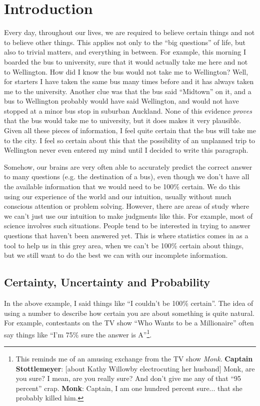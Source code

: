 \chapter{Introduction}
Every day, throughout our lives, we are required 
to believe certain things and not to believe other things. This applies not
only to the ``big questions'' of life, but also to trivial matters, and 
everything in between. For example, this morning I boarded the bus to 
university, sure that it would actually take me here and not to Wellington.
How did I know the bus would not take me to Wellington? Well, for starters
I have taken the same bus many times before and it has always taken me to the
university. Another clue was that the bus said ``Midtown'' on it, and a bus
to Wellington probably would have said Wellington, and would not have stopped
at a minor bus stop in suburban Auckland.
None of this evidence {\it proves} that the bus would take me to university,
but it does makes it very plausible. Given all these pieces of information, I feel
quite certain that the bus will take me to the city. I feel so certain
about this that the possibility of an
unplanned trip to Wellington never even entered my mind until I decided to
write this paragraph.

Somehow, our brains are very often able to accurately predict the correct answer
to many questions (e.g. the destination of a bus), even though we don't have
all the available information that we would need to be 100\% certain.
We do this using our experience of the world and our intuition, usually 
without much conscious attention or problem solving. However, there are areas
of study where we can't just use our intuition to make judgments like this.
For example, most of science involves such situations. People tend to be
interested in trying to answer questions that haven't been answered yet.
This is where statistics comes in as a tool to help us in this grey area, when we can't
be 100\% certain about things, but we still want to do the best we can with our
incomplete information.

\section{Certainty, Uncertainty and Probability}
In the above example, I said things like ``I couldn't be 100\% certain''. The
idea of using a number to describe how certain you are about something is quite natural.
For example, contestants on the TV show ``Who Wants to be a Millionaire'' often say things
like ``I'm 75\% sure the answer is A''\footnote{This reminds me of an amusing
exchange from the TV show {\it Monk}. {\bf Captain Stottlemeyer}: [about Kathy Willowby electrocuting her husband] Monk, are you sure? I mean, are you really sure? And don't give me any of that ``95 percent'' crap.
{\bf Monk}: Captain, I am one hundred percent sure... that she probably killed him.}.

